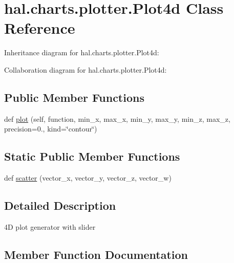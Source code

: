 \hypertarget{classhal_1_1charts_1_1plotter_1_1_plot4d}{}\section{hal.\+charts.\+plotter.\+Plot4d Class Reference}
\label{classhal_1_1charts_1_1plotter_1_1_plot4d}


Inheritance diagram for hal.\+charts.\+plotter.\+Plot4d\+:


Collaboration diagram for hal.\+charts.\+plotter.\+Plot4d\+:
\subsection*{Public Member Functions}
\begin{DoxyCompactItemize}
\item 
def \hyperlink{classhal_1_1charts_1_1plotter_1_1_plot4d_ae8bb51872773a8f3f7030ed4709d27e6}{plot} (self, function, min\+\_\+x, max\+\_\+x, min\+\_\+y, max\+\_\+y, min\+\_\+z, max\+\_\+z, precision=0., kind=\char`\"{}contour\char`\"{})
\end{DoxyCompactItemize}
\subsection*{Static Public Member Functions}
\begin{DoxyCompactItemize}
\item 
def \hyperlink{classhal_1_1charts_1_1plotter_1_1_plot4d_a54e937ece691908b033344968da476e6}{scatter} (vector\+\_\+x, vector\+\_\+y, vector\+\_\+z, vector\+\_\+w)
\end{DoxyCompactItemize}


\subsection{Detailed Description}
\begin{DoxyVerb}4D plot generator with slider \end{DoxyVerb}
 

\subsection{Member Function Documentation}
